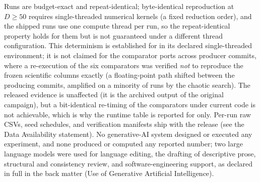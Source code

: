 Runs are budget-exact and
repeat-identical; byte-identical reproduction at $D \geq 50$ requires
single-threaded numerical kernels (a fixed reduction order), and the
shipped runs use one compute thread per run, so the repeat-identical
property holds for them but is not guaranteed under a different thread
configuration. This determinism is established for \dtgsk{} in its
declared single-threaded environment; it is not claimed for the
comparator ports across producer commits, where a re-execution of the
six comparators was verified \emph{not} to reproduce the frozen
scientific columns exactly (a floating-point path shifted between the
producing commits, amplified on a minority of runs by the chaotic
search). The released evidence is unaffected (it is the archived
output of the original campaign), but a bit-identical re-timing of the
comparators under current code is not achievable, which is why the
runtime table is reported for \dtgsk{} only. Per-run raw
CSVs, seed schedules, and verification manifests ship with the
release (see the Data Availability statement).
No generative-AI system designed or executed any experiment, and none
produced or computed any reported number; two large language models were
used for language editing, the drafting of descriptive prose, structural
and consistency review, and software-engineering support, as
declared in full in the back matter (Use of Generative Artificial
Intelligence).

